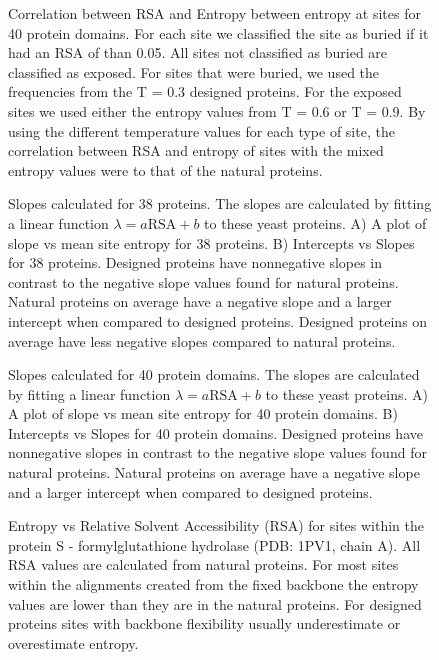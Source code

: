 \documentclass[12pt]{article}
\begin{document}
\begin{figure}[H]
\caption{Correlation between RSA and Entropy between entropy at sites for 40 protein domains. For each site we classified the site as buried if it had an RSA of than 0.05. All sites not classified as buried are classified as exposed. For sites that were buried, we used the frequencies from the T = 0.3 designed proteins. For the exposed sites we used either the entropy values from T = 0.6 or T = 0.9. By using the different temperature values for each type of site, the correlation between RSA and entropy of sites with the mixed entropy values were to that of the natural proteins.}
\label{Mixed_RSA_Entropy_Noah}
\end{figure}

\begin{figure}[H]
\centering
\caption{Slopes calculated for 38 proteins. The slopes are calculated by fitting a linear function $\lambda=a\text{RSA}+b$ to these yeast proteins.  A) A plot of slope vs mean site entropy for 38 proteins. B) Intercepts vs Slopes for 38 proteins. Designed proteins have nonnegative slopes in contrast to the negative slope values found for natural proteins.  Natural proteins on average have a negative slope and a larger intercept when compared to designed proteins. Designed proteins on average have less negative slopes compared to natural proteins.}
\label{StructureFig3}
\end{figure}



\begin{figure}[H]
\centering
\caption{Slopes calculated for 40 protein domains. The slopes are calculated by fitting a linear function $\lambda=a\text{RSA}+b$ to these yeast proteins.  A) A plot of slope vs mean site entropy for 40 protein domains. B) Intercepts vs Slopes for 40 protein domains. Designed proteins have nonnegative slopes in contrast to the negative slope values found for natural proteins.  Natural proteins on average have a negative slope and a larger intercept when compared to designed proteins.}
\label{NoahStructureFig3}
\end{figure}


\begin{figure}[H]
\centering
\caption{Entropy vs Relative Solvent Accessibility (RSA) for sites within the protein S - formylglutathione hydrolase (PDB: 1PV1, chain A). All RSA values are calculated from natural proteins. For most sites within the alignments created from the fixed backbone the entropy values are lower than they are in the natural proteins.  For designed proteins sites with backbone flexibility usually underestimate or overestimate entropy.}
\label{SiteVarFig2}
\end{figure}
\end{document}
